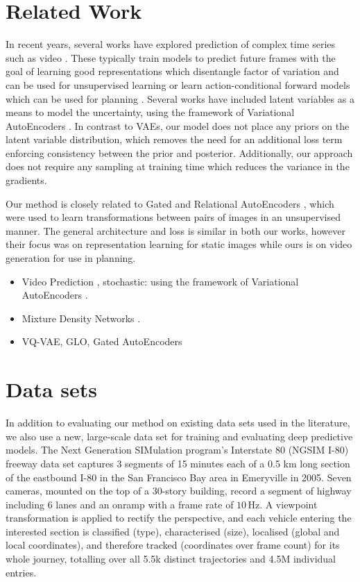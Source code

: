 \documentclass{article}
\begin{document}
\section{Related Work}

In recent years, several works have explored prediction of complex time series such as video \citep{mathieu-iclr-2016,canziani2017cortexnet}.
These typically train models to predict future frames with the goal of learning good representations which disentangle factor of variation and can be used for unsupervised learning \citep{Srivastava15, Villegas17, DentonB17} or learn action-conditional forward models which can be used for planning \citep{Oh15, FinnGL16, Poke, VideoPixel}.
Several works have included latent variables as a means to model the uncertainty, using the framework of Variational AutoEncoders \citep{Babaeizadeh2018, Denton2018}.
In contrast to VAEs, our model does not place any priors on the latent variable distribution, which removes the need for an additional loss term enforcing consistency between the prior and posterior.
Additionally, our approach does not require any sampling at training time which reduces the variance in the gradients.

Our method is closely related to Gated and Relational AutoEncoders \citep{RelationalAE, GAE}, which were used to learn transformations between pairs of images in an unsupervised manner.
The general architecture and loss is similar in both our works, however their focus was on representation learning for static images while ours is on video generation for use in planning.

\begin{itemize}
\item Video Prediction \citep{mathieu-iclr-2016}, stochastic:  using the framework of Variational AutoEncoders \citep{VAE}.
\item Mixture Density Networks \citep{mixture-density-networks}.
\item VQ-VAE, GLO, Gated AutoEncoders
\end{itemize}


\section{Data sets}

In addition to evaluating our method on existing data sets used in the literature, we also use a new, large-scale data set for training and evaluating deep predictive models.
The Next Generation SIMulation program's Interstate 80 (NGSIM I-80) freeway data set \cite{halkias2006ngsim} captures 3 segments of 15 minutes each of a 0.5 km long section of the eastbound I-80 in the San Francisco Bay area in Emeryville in 2005.
Seven cameras, mounted on the top of a 30-story building, record a segment of highway including 6 lanes and an onramp with a frame rate of $10\,\text{Hz}$.
A viewpoint transformation is applied to rectify the perspective, and each vehicle entering the interested section is classified (type), characterised (size), localised (global and local coordinates), and therefore tracked (coordinates over frame count) for its whole journey, totalling over all 5.5k distinct trajectories and 4.5M individual entries.
\end{document}

